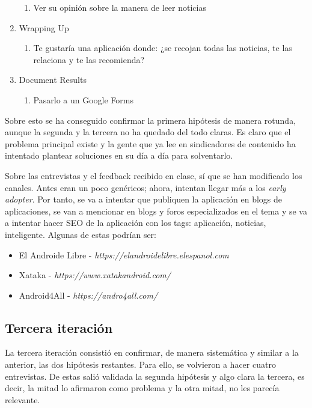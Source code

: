 \begin{enumerate}
    \begin{enumerate}
        \item Ver su opinión sobre la manera de leer noticias
    \end{enumerate}
    \item Wrapping Up
    \begin{enumerate}
        \item Te gustaría una aplicación donde: ¿se recojan todas las noticias, te las relaciona y te las recomienda?
    \end{enumerate}
    \item Document Results
    \begin{enumerate}
        \item Pasarlo a un Google Forms
    \end{enumerate}
\end{enumerate}


Sobre esto se ha conseguido confirmar la primera hipótesis de manera rotunda, aunque la segunda y la tercera no ha quedado del todo claras. Es claro que el problema principal existe y la gente que ya lee en sindicadores de contenido ha intentado plantear soluciones en su día a día para solventarlo.

Sobre las entrevistas y el feedback recibido en clase, sí que se han modificado los canales. Antes eran un poco genéricos; ahora, intentan llegar más a los \textit{early adopter}. Por tanto, se va a intentar que publiquen la aplicación en blogs de aplicaciones, se van a mencionar en blogs y foros especializados en el tema y se va a intentar hacer SEO de la aplicación con los tags: aplicación, noticias, inteligente. Algunas de estas podrían ser:

\begin{itemize}
    \item El Androide Libre - \textsl{https://elandroidelibre.elespanol.com}
    \item Xataka - \textsl{https://www.xatakandroid.com/}
    \item Android4All - \textsl{https://andro4all.com/}
\end{itemize}


\subsection{Tercera iteración}

La tercera iteración consistió en confirmar, de manera sistemática y similar a la anterior, las dos hipótesis restantes. Para ello, se volvieron a hacer cuatro entrevistas. De estas salió validada la segunda hipótesis y algo clara la tercera, es decir, la mitad lo afirmaron como problema y la otra mitad, no les parecía relevante.

